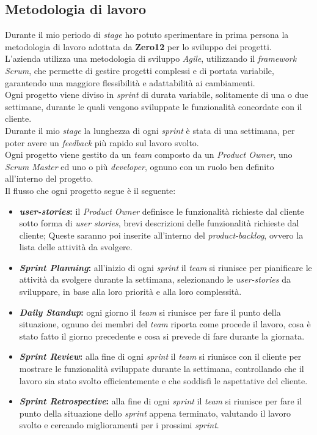 \subsection{Metodologia di lavoro}
\label{sez:metodologia-lavoro}

Durante il mio periodo di \textit{stage} ho potuto sperimentare in prima persona la metodologia di lavoro adottata da \textbf{Zero12} per lo sviluppo dei progetti.\\
L'azienda utilizza una metodologia di sviluppo \textit{Agile}, utilizzando il \textit{framework} \textit{Scrum}, che permette di gestire progetti complessi e di portata variabile,
garantendo una maggiore flessibilità e adattabilità ai cambiamenti.\\
Ogni progetto viene diviso in \textit{sprint} di durata variabile, solitamente di una o due settimane, durante le quali vengono sviluppate le funzionalità concordate con il cliente.\\
Durante il mio \textit{stage} la lunghezza di ogni \textit{sprint} è stata di una settimana, per poter avere un \textit{feedback} più rapido sul lavoro svolto.\\
Ogni progetto viene gestito da un \textit{team} composto da un \textit{Product Owner}, uno \textit{Scrum Master} ed uno o più \textit{developer}, ognuno con un ruolo ben definito all'interno del progetto.\\

Il flusso che ogni progetto segue è il seguente:
\begin{itemize}
    \item \textbf{\textit{\gls{user-stories}}:} il \textit{Product Owner} definisce le funzionalità richieste dal cliente sotto forma di \textit{user stories}, brevi descrizioni delle funzionalità richieste dal cliente;
    Queste saranno poi inserite all'interno del \textit{\gls{product-backlog}}, ovvero la lista delle attività da svolgere.
    \item \textbf{\textit{Sprint Planning}:} all'inizio di ogni \textit{sprint} il \textit{team} si riunisce per pianificare le attività da svolgere durante la settimana, selezionando le \textit{\gls{user-stories}} da sviluppare, 
    in base alla loro priorità e alla loro complessità.
    \item \textbf{\textit{Daily Standup}:} ogni giorno il \textit{team} si riunisce per fare il punto della situazione, ognuno dei membri del \textit{team} riporta come procede il lavoro,
    cosa è stato fatto il giorno precedente e cosa si prevede di fare durante la giornata.
    \item \textbf{\textit{Sprint Review}:} alla fine di ogni \textit{sprint} il \textit{team} si riunisce con il cliente per mostrare le funzionalità sviluppate durante la settimana, controllando che il lavoro sia stato svolto efficientemente e 
    che soddisfi le aspettative del cliente.
    \item \textbf{\textit{Sprint Retrospective}:} alla fine di ogni \textit{sprint} il \textit{team} si riunisce per fare il punto della situazione dello \textit{sprint} appena terminato, 
    valutando il lavoro svolto e cercando miglioramenti per i prossimi \textit{sprint}.
\end{itemize}